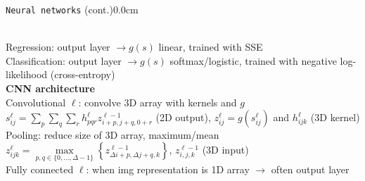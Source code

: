 \documentclass[10pt,3col]{cheatsheet}
\begin{document}
\begin{multicols}{3}
\begin{cheatsheetbox}{\texttt{Neural networks} (cont.)}{0.0cm}
\begin{minipage}{.5\textwidth}
    \end{minipage}\\
    Regression: output layer $\rightarrow g(s)$ linear, trained with SSE\\
    Classification: output layer $\rightarrow g(s)$ softmax/logistic, trained with negative log-likelihood (cross-entropy)\\
    \textbf{CNN architecture}\\
    Convolutional $\ell$: convolve 3D array with kernels and $g$\\
    $s^\ell_{ij} = \sum_p\sum_q\sum_r h_{pqr}^\ell z^{\ell-1}_{i+p,j+q,0+r}$ (2D output), $z_{ij}^\ell = g(s_{ij}^\ell)$ and $h_{ijk}^\ell$ (3D kernel)\\
    Pooling: reduce size of 3D array, maximum/mean\\
    $z_{ijk}^\ell = \underset{p,q \in \{0,\dots, \Delta-1\}}{\max} \left\{z^{\ell - 1}_{\Delta i +p, \Delta j + q, k}\right\}$, $z^{\ell-1}_{i,j,k}$ (3D input)\\
    Fully connected $\ell$: when img representation is 1D array $\rightarrow$ often output layer
\end{cheatsheetbox}


\end{multicols}
\end{document}
